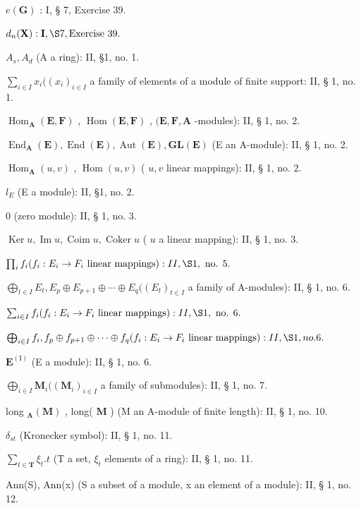 \(e(\mathbf{G})\) : I, § 7, Exercise 39.

\(d_{n}(\mathbf{X}) : \mathbf{I}, \S 7, \text{Exercise 39.}\)

\(A_{s}, A_{d}\) (A a ring): II, §1, no. 1.

\(\sum_{i \in I} x_i((x_i)_{i \in I}\) a family of elements of a module of finite support: II, § 1, no. 1.

\(\operatorname{Hom}_{\mathbf{A}}(\mathbf{E}, \mathbf{F})\) , \(\operatorname{Hom}(\mathbf{E}, \mathbf{F})\) , \((\mathbf{E}, \mathbf{F}, \mathbf{A}\) -modules): II, § 1, no. 2.

\(\operatorname{End}_{\mathbf{A}}(\mathbf{E}), \operatorname{End}(\mathbf{E}), \operatorname{Aut}(\mathbf{E}), \mathbf{GL}(\mathbf{E})\) (E an A-module): II, § 1, no. 2.

\(\operatorname{Hom}_{\mathbf{A}}(u, v)\) , \(\operatorname{Hom}(u, v)\) ( \(u, v\) linear mappings): II, § 1, no. 2.

\(l_{E}\) (E a module): II, §1, no. 2.

0 (zero module): II, § 1, no. 3.

\(\operatorname{Ker} u, \operatorname{Im} u, \operatorname{Coim} u, \operatorname{Coker} u\) ( \(u\) a linear mapping): II, § 1, no. 3.

\(\prod_{i}f_{i}(f_{i}:E_{i}\to F_{i}\text{ linear mappings}):II,\S 1,\text{ no. }5.\)

\(\bigoplus_{t \in I} E_t, E_p \oplus E_{p+1} \oplus \cdots \oplus E_q ((E_t)_{t \in I}\) a family of A-modules): II, § 1, no. 6.

\(\sum_{i \in I} f_i (f_i: E_i \to F_i \text{ linear mappings}): II, \S 1, \text{ no. } 6.\)

\(\bigoplus_{i\in I}f_{i},f_{p}\oplus f_{p+1}\oplus\cdots\oplus f_{q}(f_{i}:E_{i}\to F_{i}\text{ linear mappings}):II,\S 1,no.6.\)

\(\mathbf{E}^{(\mathrm{I})}\) (E a module): II, § 1, no. 6.

\(\bigoplus_{i \in I} \mathbf{M}_i ((\mathbf{M}_i)_{i \in I}\) a family of submodules): II, § 1, no. 7.

long \(_{\mathbf{A}}(\mathbf{M})\) , long( \(\mathbf{M}\) ) (M an A-module of finite length): II, § 1, no. 10.

\(\delta_{st}\) (Kronecker symbol): II, § 1, no. 11.

\(\sum_{t \in \mathbf{T}} \xi_t. t\) (T a set, \(\xi_t\) elements of a ring): II, § 1, no. 11.

Ann(S), Ann(x) (S a subset of a module, x an element of a module): II, § 1, no. 12.

